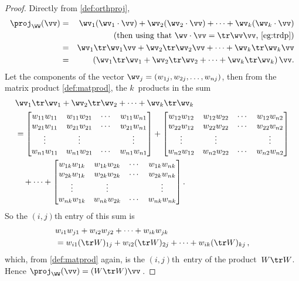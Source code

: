 \begin{proof} 
Directly from \cref{def:orthproj},
\begin{eqnarray*}
\proj_\WW(\vv)&=&\wv_1(\wv_1\cdot\vv)+\wv_2(\wv_2\cdot\vv)+\cdots+\wv_k(\wv_k\cdot\vv)
\\&&(\text{then using that \(\wv\cdot\vv=\tr\wv\vv\), \cref{eg:trdp}})
\\&=&\wv_1\tr\wv_1\vv+\wv_2\tr\wv_2\vv+\cdots+\wv_k\tr\wv_k\vv
\\&=&\left(\wv_1\tr\wv_1+\wv_2\tr\wv_2+\cdots+\wv_k\tr\wv_k\right)\vv.
\end{eqnarray*}
Let the components of the vector \(\wv_j=(w_{1j},w_{2j},\ldots,w_{nj})\), then from the matrix product \cref{def:matprod}, the \(k\)~products in the sum 
\def\ww#1{\begin{bmatrix} 
w_{1#1}w_{1#1}& w_{1#1}w_{2#1}&\cdots& w_{1#1}w_{n#1} \\
w_{2#1}w_{1#1}& w_{2#1}w_{2#1}&\cdots& w_{2#1}w_{n#1} \\
\vdots&\vdots&&\vdots\\
w_{n#1}w_{1#1}& w_{n#1}w_{2#1}&\cdots& w_{n#1}w_{n#1} 
\end{bmatrix}}
\begin{align*}
&\wv_1\tr\wv_1+\wv_2\tr\wv_2+\cdots+\wv_k\tr\wv_k
\\&= \ww1 +\ww2
\\&\quad{}+\cdots +\ww k.
\end{align*}
So the \((i,j)\)th entry of this sum is
\begin{align*}
&w_{i1}w_{j1}+w_{i2}w_{j2}+\cdots+w_{ik}w_{jk}
\\&=w_{i1}(\tr W)_{1j}+w_{i2}(\tr W)_{2j}+\cdots+w_{ik}(\tr W)_{kj} \,,
\end{align*}
which, from \cref{def:matprod} again, is the \((i,j)\)th~entry of the product~\(W\tr W\).
Hence \(\proj_\WW(\vv)=(W\tr W)\vv\)\,.
\end{proof}



